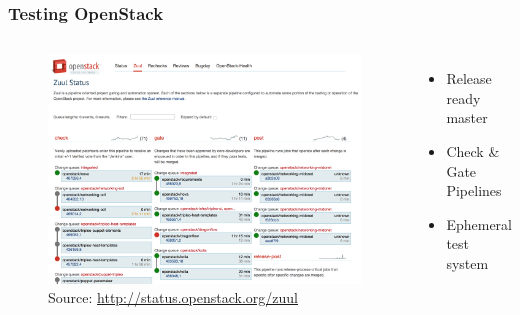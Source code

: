 \documentclass[aspectratio=169,11pt,hyperref={colorlinks=true}]{beamer}
\begin{document}

\begin{frame}
    \frametitle{Testing OpenStack}
       \begin{columns}
    \begin{figure}
    \begin{center}
    	\includegraphics[width=1\textwidth]{zuul_status.png}
         \caption{Source: \href{http://status.openstack.org/zuul}{http://status.openstack.org/zuul}}
    \end{center}
    \end{figure}
    \begin{itemize}
        \item{Release ready master}
        \item{Check \& Gate Pipelines}
        \item{Ephemeral test system}
    \end{itemize}
       \end{columns}
\end{frame}

\end{document}
